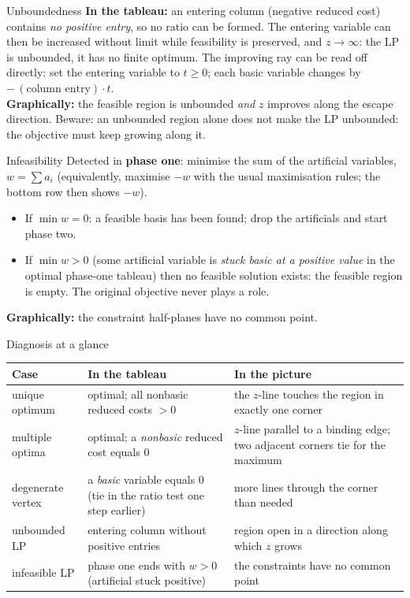 \begin{rulebox}{Unboundedness}
\textbf{In the tableau:} an entering column (negative reduced cost)
contains \emph{no positive entry}, so no ratio can be formed. The entering
variable can then be increased without limit while feasibility is
preserved, and $z\to\infty$: the LP is unbounded, it has no finite
optimum. The improving ray can be read off directly: set the entering
variable to $t\ge 0$; each basic variable changes by $-\,(\text{column
entry})\cdot t$.\\[0.4ex]
\textbf{Graphically:} the feasible region is unbounded \emph{and} $z$
improves along the escape direction. Beware: an unbounded region alone does
not make the LP unbounded: the objective must keep growing along it.
\end{rulebox}

\begin{rulebox}{Infeasibility}
Detected in \textbf{phase one}: minimise the sum of the artificial
variables, $w=\sum a_i$ (equivalently, maximise $-w$ with the usual
maximisation rules; the bottom row then shows $-w$).
\begin{itemize}[leftmargin=1.6em,itemsep=0.3ex]
  \item If $\min w=0$: a feasible basis has been found; drop the
        artificials and start phase two.
  \item If $\min w>0$ (some artificial variable is \emph{stuck basic at
        a positive value} in the optimal phase-one tableau) then no
        feasible solution exists: the feasible region is empty. The original objective never
        plays a role.
\end{itemize}
\textbf{Graphically:} the constraint half-planes have no common point.
\end{rulebox}

\begin{rulebox}{Diagnosis at a glance}
\begin{center}
\begin{tabular}{p{2.9cm}|p{5.7cm}|p{5.6cm}}
\hline
\textbf{Case} & \textbf{In the tableau} & \textbf{In the picture}\\
\hline
unique optimum & optimal; all nonbasic reduced costs $>0$ &
  the $z$-line touches the region in exactly one corner\\
\hline
multiple optima & optimal; a \emph{nonbasic} reduced cost equals $0$ &
  $z$-line parallel to a binding edge; two adjacent corners tie for the
  maximum\\
\hline
degenerate vertex & a \emph{basic} variable equals $0$ (tie in the ratio
  test one step earlier) & more lines through the corner than needed\\
\hline
unbounded LP & entering column without positive entries &
  region open in a direction along which $z$ grows\\
\hline
infeasible LP & phase one ends with $w>0$ (artificial stuck positive) &
  the constraints have no common point\\
\hline
\end{tabular}
\end{center}
\end{rulebox}

